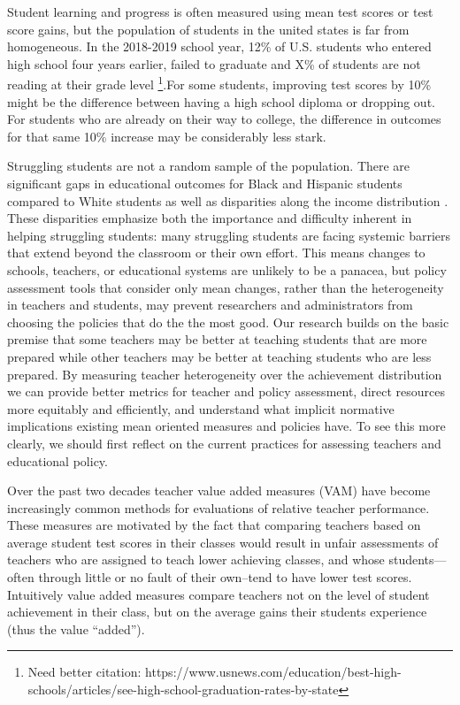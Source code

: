 \documentclass{article}
\theoremstyle{definition}
\theoremstyle{definition}
\theoremstyle{definition}
\begin{document}
Student learning and progress is often measured using mean test scores or test score gains, but the population of students in the united states is far from homogeneous. In the 2018-2019 school year, 12\% of U.S. students who entered high school four years earlier, failed to graduate and X\% of students are not reading at their grade level \footnote{Need better citation: https://www.usnews.com/education/best-high-schools/articles/see-high-school-graduation-rates-by-state}.For some students, improving test scores by 10\% might be the difference between having a high school diploma or dropping out. For students who are already on their way to college, the difference in outcomes for that same 10\% increase may be considerably less stark. 

Struggling students are not a random sample of the population. There are significant gaps in educational outcomes for Black and Hispanic students compared to White students as well as disparities along the income distribution \citep{Reardon_2013, Reardon_2011}. These disparities emphasize both the importance and difficulty inherent in helping struggling students: many struggling students are facing systemic barriers that extend beyond the classroom or their own effort. This means changes to schools, teachers, or educational systems are unlikely to be a panacea, but policy assessment tools that consider only mean changes, rather than the heterogeneity in teachers and students, may prevent researchers and administrators from choosing the policies that do the the most good. Our research builds on the basic premise that some teachers may be better at teaching students that are more prepared while other teachers may be better at teaching students who are less prepared. By measuring teacher heterogeneity over the achievement distribution we can provide better metrics for teacher and policy assessment, direct resources more equitably and efficiently, and understand what implicit normative implications existing mean oriented measures and policies have. To see this more clearly, we should first reflect on the current practices for assessing teachers and educational policy.
	
 Over the past two decades teacher value added measures (VAM) have become increasingly common methods for evaluations of relative teacher performance. These measures are motivated by the fact that comparing teachers based on average student test scores in their classes would result in unfair assessments of teachers who are assigned to teach lower achieving classes, and whose students---often through little or no fault of their own--tend to have lower test scores. Intuitively value added measures compare teachers not on the level of student achievement in their class, but on the average gains their students experience (thus the value ``added'').
\end{document}
